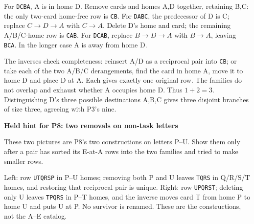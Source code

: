 \documentclass[11pt]{article}
\newcommand{\subhead}[1]{\par\textbf{#1}\par}
\newcommand{\row}[1]{\texttt{#1}}
\newcommand{\cyclefive}[2]{%
  \foreach \v [count=\i from 0] in {#1}{%
    \node[circle,draw,fill=white,minimum size=6mm,inner sep=0pt,font=\small] (v\i) at ({90-72*\i}:#2) {\v};}
  \foreach \i/\j in {0/1,1/2,2/3,3/4,4/0}{\draw[-{Stealth[length=2mm]},thin] (v\i)--(v\j);}}
\newcommand{\cyclesix}[2]{%
  \foreach \v [count=\i from 0] in {#1}{%
    \node[circle,draw,fill=white,minimum size=5.8mm,inner sep=0pt,font=\small] (v\i) at ({90-60*\i}:#2) {\v};}
  \foreach \i/\j in {0/1,1/2,2/3,3/4,4/5,5/0}{\draw[-{Stealth[length=1.8mm]},thin] (v\i)--(v\j);}}
\newcommand{\cyclefour}[2]{%
  \foreach \v [count=\i from 0] in {#1}{%
    \node[circle,draw,fill=white,minimum size=6mm,inner sep=0pt,font=\small] (v\i) at ({90-90*\i}:#2) {\v};}
  \foreach \i/\j in {0/1,1/2,2/3,3/0}{\draw[-{Stealth[length=1.8mm]},thin] (v\i)--(v\j);}}
\begin{document}
For \row{DCBA}, A is in home D. Remove cards and homes A,D together, retaining B,C: the only two-card home-free row is \row{CB}. For \row{DABC}, the predecessor of D is C; replace $C\to D\to A$ with $C\to A$. Delete D's home and card; the remaining A/B/C-home row is \row{CAB}. For \row{DCAB}, replace $B\to D\to A$ with $B\to A$, leaving \row{BCA}. In the longer case A is away from home D.

The inverses check completeness: reinsert A/D as a reciprocal pair into \row{CB}; or take each of the two A/B/C derangements, find the card in home A, move it to home D and place D at A. Each gives exactly one original row. The families do not overlap and exhaust whether A occupies home D. Thus $1+2=3$. Distinguishing D's three possible destinations A,B,C gives three disjoint branches of size three, agreeing with P3's nine.

\subhead{Held hint for P8: two removals on non-task letters}
These two pictures are P8's two constructions on letters P--U. Show them only after a pair has sorted its E-at-A rows into the two families and tried to make smaller rows.
\begin{center}\end{center}
Left: row \row{UTQRSP} in P--U homes; removing both P and U leaves \row{TQRS} in Q/R/S/T homes, and restoring that reciprocal pair is unique. Right: row \row{UPQRST}; deleting only U leaves \row{TPQRS} in P--T homes, and the inverse moves card T from home P to home U and puts U at P. No survivor is renamed. These are the constructions, not the A--E catalog.
\end{document}
